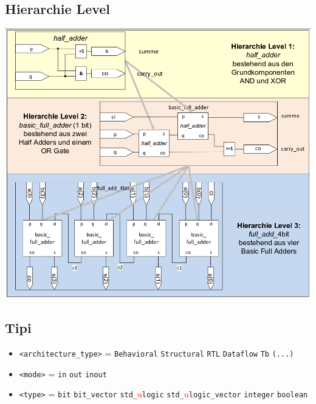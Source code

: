         
        \subsection{Hierarchie Level}
            \begin{minipage}[t]{\columnwidth}
            \vspace{0pt}  %
                \includegraphics[width=\linewidth]{Images/HierarchienLevel.png}
            \end{minipage}

    \subsection{Tipi}
        \begin{itemize}
            \item \texttt{<architecture\_type>} = \texttt{Behavioral} \textbar{} \texttt{Structural} \textbar{} \texttt{RTL} \textbar{} \texttt{Dataflow} \textbar{} \texttt{Tb} \textbar{} \texttt{(...)} 
            \item \texttt{<mode>} = \texttt{in} \textbar{} \texttt{out} \textbar{} \texttt{inout}
            \item \texttt{<type>} = \texttt{bit} \textbar{} \texttt{bit\_vector} \textbar{} \texttt{std\_}\textcolor{red}{u}\texttt{logic} \textbar{} \texttt{std\_}\textcolor{red}{u}\texttt{logic\_vector} \textbar{} \texttt{integer} \textbar{} \texttt{boolean}
        \end{itemize}
        


